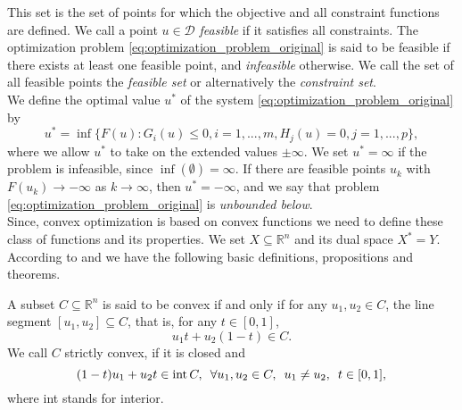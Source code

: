     This set is the set of points for which the objective and all constraint functions are defined. We call a point $u \in \mathcal{D}$ \textit{feasible} if it satisfies all constraints. The optimization problem \ref{eq:optimization_problem_original} is said to be feasible if there exists at least one feasible point, and \textit{infeasible} otherwise. We call the set of all feasible points the \textit{feasible set} or alternatively the \textit{constraint set}.\\
    We define the optimal value $u^{\ast}$ of the system \ref{eq:optimization_problem_original} by
        $$
            u^{\ast} = \inf \big\{ F(u) : G_{i}(u) \le 0, i = 1, ..., m, H_{j}(u) = 0, j = 1, ..., p \big\},
        $$
    where we allow $u^{\ast}$ to take on the extended values $\pm \infty$. We set $u^{\ast} = \infty$ if the problem is infeasible, since $\inf(\emptyset) = \infty$. If there are feasible points $u_{k}$ with $F(u_{k}) \longrightarrow -\infty$ as $k \longrightarrow \infty$, then $u^{\ast} = -\infty$, and we say that problem \ref{eq:optimization_problem_original} is \textit{unbounded below}.\\

    Since, convex optimization is based on convex functions we need to define these class of functions and its properties. We set $X \subseteq \mathbb{R}^{n}$ and its dual space $X^{\ast} = Y$. According to \cite{Chambolle-et-al-10} and \cite{Rockafellar} we have the following basic definitions, propositions and theorems.

    \begin{definition} %
    \label{def:convex_set}

        A subset $C \subseteq \mathbb{R}^{n}$ is said to be convex if and only if for any $u_{1}, u_{2} \in C$, the line segment $[u_{1}, u_{2}] \subseteq C$, that is, for any $t \in [0, 1]$,
            \begin{equation}
                u_{1}t + u_{2}(1 - t) \in C.
                \label{eq:convex_set}
            \end{equation}
        We call $C$ strictly convex, if it is closed and
            \begin{equation}
                (1 - t)u_{1} + u_{2}t \in \textnormal{int}\,C, \,\,\, \forall u_{1}, u_{2} \in C, \,\,\, u_{1} \ne u_{2}, \,\,\, t \in [0, 1],
                \label{eq:strictly_convex_set}
            \end{equation}
        where \textnormal{int} stands for interior.

    \end{definition}

